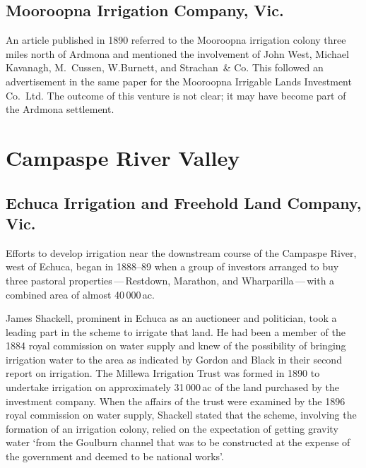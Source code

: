 \subsection*{Mooroopna Irrigation Company, Vic.}

An article published in 1890 referred to the Mooroopna irrigation
colony three miles north of Ardmona and mentioned the involvement of
John West, Mich\-ael Kavanagh, M.~Cussen, W.Burnett, and Strachan~\& Co.
This followed an advertisement in the same paper for the Mooroopna
Irrigable Lands Investment Co.\ Ltd. The outcome of this venture is
not clear; it may have become part of the Ardmona
settlement.

\section*{Campaspe River Valley}

\subsection*{Echuca Irrigation and Freehold Land Company, Vic.}

Efforts to develop irrigation near the downstream course of the
Campaspe River, west of Echuca, began in 1888--89 when a group of
investors arranged to buy three pastoral properties\,---\,Restdown,
Marathon, and Wharparilla\,---\,with a combined area of almost
40\,000\,ac.

James Shackell, prominent in Echuca as an auctioneer and politician,
took a leading part in the scheme to irrigate that land.  He had been
a member of the 1884 royal commission on water supply and knew of the
possibility of bringing irrigation water to the area as indicated by
Gordon and Black in their second report on irrigation.  The Millewa
Irrigation Trust was formed in 1890 to undertake irrigation on
approximately 31\,000\,ac of the land purchased by the investment
company.  When the affairs of the trust were examined by the 1896
royal commission on water supply, Shackell stated that the scheme,
involving the formation of an irrigation colony, relied on the
expectation of getting gravity water `from the Goulburn channel that
was to be constructed at the expense of the government and deemed to
be national works'.

